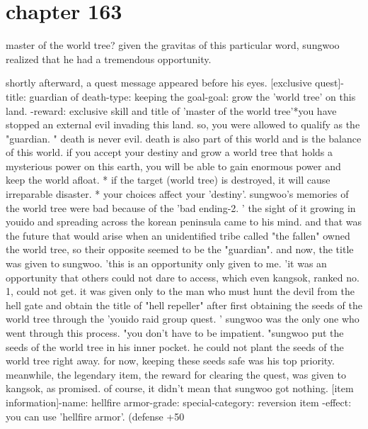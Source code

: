\section{chapter 163}

master of the world tree? given the gravitas of this particular word, sungwoo realized that he had a tremendous opportunity.





shortly afterward, a quest message appeared before his eyes.
[exclusive quest]-title: guardian of death-type: keeping the goal-goal: grow the 'world tree' on this land.
-reward: exclusive skill and title of 'master of the world tree'*you have stopped an external evil invading this land.
 so, you were allowed to qualify as the "guardian.
" death is never evil.
 death is also part of this world and is the balance of this world.
 if you accept your destiny and grow a world tree that holds a mysterious power on this earth, you will be able to gain enormous power and keep the world afloat.
* if the target (world tree) is destroyed, it will cause irreparable disaster.
* your choices affect your 'destiny'.
 sungwoo's memories of the world tree were bad because of the 'bad ending-2.
' the sight of it growing in youido and spreading across the korean peninsula came to his mind.
 and that was the future that would arise when an unidentified tribe called "the fallen" owned the world tree, so their opposite seemed to be the "guardian".
and now, the title was given to sungwoo.
 'this is an opportunity only given to me.
'it was an opportunity that others could not dare to access, which even kangsok, ranked no.
 1, could not get.
 it was given only to the man who must hunt the devil from the hell gate and obtain the title of "hell repeller" after first obtaining the seeds of the world tree through the 'youido raid group quest.
' sungwoo was the only one who went through this process.
"you don't have to be impatient.
"sungwoo put the seeds of the world tree in his inner pocket.
 he could not plant the seeds of the world tree right away.
 for now, keeping these seeds safe was his top priority.
meanwhile, the legendary item, the reward for clearing the quest, was given to kangsok, as promised.
 of course, it didn't mean that sungwoo got nothing.
[item information]-name: hellfire armor-grade: special-category: reversion item
-effect: you can use 'hellfire armor'.
 (defense +50%
